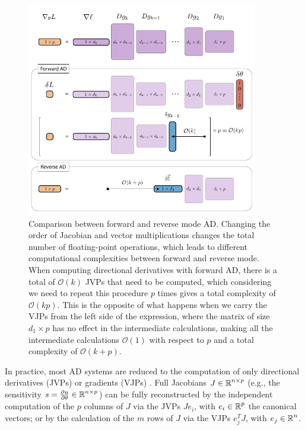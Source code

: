 \begin{figure}[p]
    \centering
    \includegraphics[width=0.90\textwidth]{figures/VJP-AD.pdf}
    \caption{Comparison between forward and reverse mode AD. Changing the order of Jacobian and vector multiplications changes the total number of floating-point operations, which leads to different computational complexities between forward and reverse mode. When computing directional derivatives with forward AD, there is a total of $\mathcal O (k)$ JVPs that need to be computed, which considering we need to repeat this procedure $p$ times gives a total complexity of $\mathcal O (kp)$. This is the opposite of what happens when we carry the VJPs from the left side of the expression, where the matrix of size $d_1 \times p$ has no effect in the intermediate calculations, making all the intermediate calculations $\mathcal O (1)$ with respect to $p$ and a total complexity of $\mathcal O (k + p)$. }
    \label{fig:vjp-jvp}
\end{figure}

In practice, most AD systems are reduced to the computation of only directional derivatives (JVPs) or gradients (VJPs) \cite{Griewank:2008kh}.
Full Jacobians $J \in \operatorname{\mathbb{R}}^{n \times p}$ (e.g., the sensitivity $s = \frac{\partial u}{\partial \theta} \in \operatorname{\mathbb{R}}^{n \times p}$) can be fully reconstructed by the independent computation of the $p$ columns of $J$ via the JVPs $J e_i$, with $e_i \in \operatorname{\mathbb{R}}^p$ the canonical vectors; or by the calculation of the $m$ rows of $J$ via the VJPs $e_j^T J$, with $e_j \in \operatorname{\mathbb{R}}^n$.


